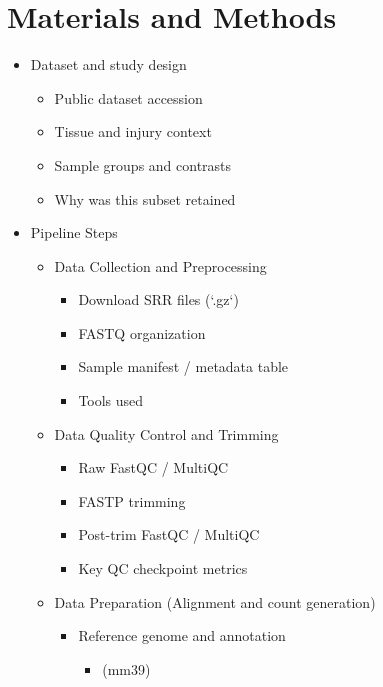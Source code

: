 \documentclass[12pt]{article}
\begin{document}
\section*{\textcolor{pitercolor}{Materials and Methods}}
\begin{itemize}
\item \textcolor{pitercolor}{Dataset and study design}
\begin{itemize}
\item \textcolor{pitercolor}{Public dataset accession}
\item \textcolor{pitercolor}{Tissue and injury context}
\item \textcolor{pitercolor}{Sample groups and contrasts}
\item \textcolor{pitercolor}{Why was this subset retained}
\end{itemize}
\item \textcolor{nikhicolor}{Pipeline Steps}
\begin{itemize}
\item \textcolor{nikhicolor}{Data Collection and Preprocessing}
\begin{itemize}
\item \textcolor{nikhicolor}{Download SRR files (`.gz`)}
\item \textcolor{pitercolor}{FASTQ organization}
\item \textcolor{pitercolor}{Sample manifest / metadata table}
\item \textcolor{pitercolor}{Tools used}
\end{itemize}
\item \textcolor{nikhicolor}{Data Quality Control and Trimming}
\begin{itemize}
\item \textcolor{nikhicolor}{Raw FastQC / MultiQC}
\item \textcolor{nikhicolor}{FASTP trimming}
\item \textcolor{nikhicolor}{Post-trim FastQC / MultiQC}
\item \textcolor{nikhicolor}{Key QC checkpoint metrics}
\end{itemize}
\item \textcolor{nikhicolor}{Data Preparation (Alignment and count generation)}
\begin{itemize}
\item \textcolor{nikhicolor}{Reference genome and annotation}
\begin{itemize}
\item \textcolor{nikhicolor}{(mm39)}
\end{itemize}

\end{itemize}
\end{itemize}
\end{itemize}
\end{document}
